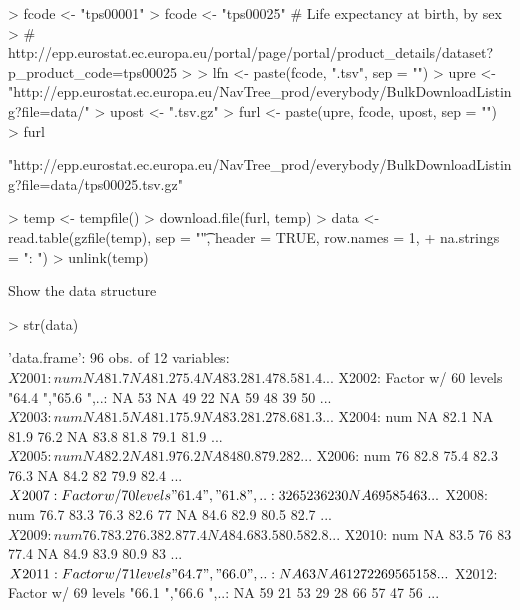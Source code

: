 \documentclass[a4paper,12pt]{article}\usepackage[]{graphicx}\usepackage[]{color}
\begin{document}
\begin{Schunk}
\begin{Sinput}
> fcode <- "tps00001"
> fcode <- "tps00025"  # Life expectancy at birth, by sex
> # http://epp.eurostat.ec.europa.eu/portal/page/portal/product_details/dataset?p_product_code=tps00025
> 
> lfn <- paste(fcode, ".tsv", sep = "")
> upre <- "http://epp.eurostat.ec.europa.eu/NavTree_prod/everybody/BulkDownloadListing?file=data/"
> upost <- ".tsv.gz"
> furl <- paste(upre, fcode, upost, sep = "")
> furl
\end{Sinput}
\begin{Soutput}
[1] "http://epp.eurostat.ec.europa.eu/NavTree_prod/everybody/BulkDownloadListing?file=data/tps00025.tsv.gz"
\end{Soutput}
\end{Schunk}

\begin{Schunk}
\begin{Sinput}
> temp <- tempfile()
> download.file(furl, temp)
> data <- read.table(gzfile(temp), sep = "\t", header = TRUE, row.names = 1, 
+     na.strings = ": ")
> unlink(temp)
\end{Sinput}
\end{Schunk}

Show the data structure

\begin{Schunk}
\begin{Sinput}
> str(data)
\end{Sinput}
\begin{Soutput}
'data.frame':	96 obs. of  12 variables:
 $ X2001: num  NA 81.7 NA 81.2 75.4 NA 83.2 81.4 78.5 81.4 ...
 $ X2002: Factor w/ 60 levels "64.4 ","65.6 ",..: NA 53 NA 49 22 NA 59 48 39 50 ...
 $ X2003: num  NA 81.5 NA 81.1 75.9 NA 83.2 81.2 78.6 81.3 ...
 $ X2004: num  NA 82.1 NA 81.9 76.2 NA 83.8 81.8 79.1 81.9 ...
 $ X2005: num  NA 82.2 NA 81.9 76.2 NA 84 80.8 79.2 82 ...
 $ X2006: num  76 82.8 75.4 82.3 76.3 NA 84.2 82 79.9 82.4 ...
 $ X2007: Factor w/ 70 levels "61.4 ","61.8 ",..: 32 65 23 62 30 NA 69 58 54 63 ...
 $ X2008: num  76.7 83.3 76.3 82.6 77 NA 84.6 82.9 80.5 82.7 ...
 $ X2009: num  76.7 83.2 76.3 82.8 77.4 NA 84.6 83.5 80.5 82.8 ...
 $ X2010: num  NA 83.5 76 83 77.4 NA 84.9 83.9 80.9 83 ...
 $ X2011: Factor w/ 71 levels "64.7 ","66.0 ",..: NA 63 NA 61 27 22 69 56 51 58 ...
 $ X2012: Factor w/ 69 levels "66.1 ","66.6 ",..: NA 59 21 53 29 28 66 57 47 56 ...
\end{Soutput}
\end{Schunk}
\end{document}
